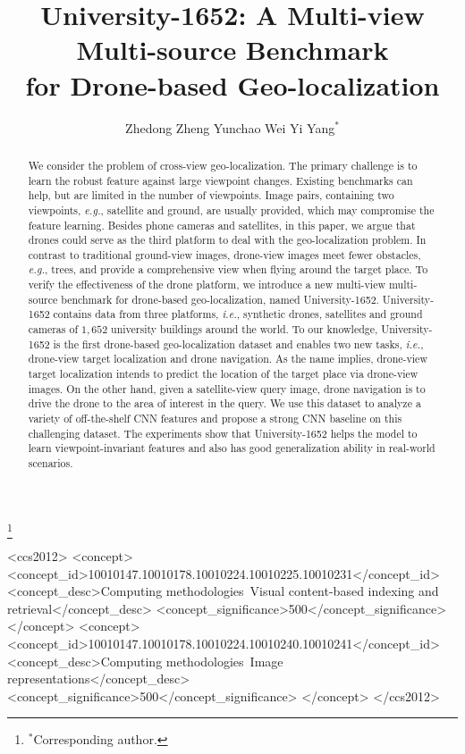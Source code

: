 \documentclass[sigconf]{acmart}
\def\eg{\emph{e.g.}}
\def\ie{\emph{i.e.}}
\begin{document}
\fancyhead{}
\title{ University-1652: A Multi-view Multi-source Benchmark \\ for Drone-based Geo-localization}

\author{  
Zhedong Zheng \quad Yunchao Wei \quad Yi Yang$^{*}$  } 
\thanks{$^{*}$Corresponding author.}


\begin{abstract}
We consider the problem of cross-view geo-localization. 
The primary challenge is to learn the robust feature against large viewpoint changes. Existing benchmarks can help, but are limited in the number of viewpoints. Image pairs, containing two viewpoints, \eg, satellite and ground, are usually provided, which may compromise the feature learning. Besides phone cameras and satellites, in this paper, we argue that drones could serve as the third platform to deal with the geo-localization problem. In contrast to traditional ground-view images, drone-view images meet fewer obstacles, \eg, trees, and provide a comprehensive view when flying around the target place. To verify the effectiveness of the drone platform, we introduce a new multi-view multi-source benchmark for drone-based geo-localization, named University-1652. University-1652 contains data from three platforms, \ie, synthetic drones, satellites and ground cameras of $1,652$ university buildings around the world.
To our knowledge, University-1652 is the first drone-based geo-localization dataset and enables two new tasks, \ie, drone-view target localization and drone navigation.
As the name implies, drone-view target localization intends to predict the location of the target place via drone-view images. On the other hand, given a satellite-view query image, drone navigation is to drive the drone to the area of interest in the query.
We use this dataset to analyze a variety of off-the-shelf CNN features and propose a strong CNN baseline on this challenging dataset. The experiments show that University-1652 helps the model to learn viewpoint-invariant features and also has good generalization ability in real-world scenarios. 
\end{abstract}

\begin{CCSXML}
<ccs2012>
   <concept>
       <concept_id>10010147.10010178.10010224.10010225.10010231</concept_id>
       <concept_desc>Computing methodologies~Visual content-based indexing and retrieval</concept_desc>
       <concept_significance>500</concept_significance>
       </concept>
   <concept>
       <concept_id>10010147.10010178.10010224.10010240.10010241</concept_id>
       <concept_desc>Computing methodologies~Image representations</concept_desc>
       <concept_significance>500</concept_significance>
       </concept>
 </ccs2012>
\end{CCSXML}
\end{document}
